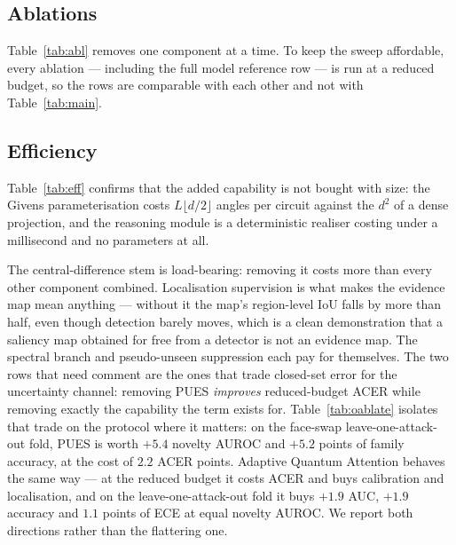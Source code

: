 \documentclass[conference]{IEEEtran}
\begin{document}
\begin{table}[t]
\centering
\caption{Faithfulness of the three intrinsic explanation channels, measured on the
model's own attack score. Deletion is the informative direction: lower than the
control means the named regions carry the decision.}
\label{tab:faith}
\footnotesize
\resizebox{\linewidth}{!}{}
\end{table}

\subsection{Ablations}\label{sec:abl}
Table~\ref{tab:abl} removes one component at a time. To keep the sweep affordable,
every ablation --- including the full model reference row --- is run at a reduced
budget, so the rows are comparable with each other and not with
Table~\ref{tab:main}.

\begin{table}[t]
\centering
\caption{Component ablation (reduced budget; deltas are w.r.t.\ the full model in
the first row).}
\label{tab:abl}
\small
\resizebox{\linewidth}{!}{}
\end{table}

\subsection{Efficiency}
Table~\ref{tab:eff} confirms that the added capability is not bought with size:
the Givens parameterisation costs $L\lfloor d/2\rfloor$ angles per circuit against
the $d^{2}$ of a dense projection, and the reasoning module is a deterministic
realiser costing under a millisecond and no parameters at all.

The central-difference stem is load-bearing: removing it costs more than every
other component combined. Localisation supervision is what makes the evidence map
mean anything --- without it the map's region-level IoU falls by more than half,
even though detection barely moves, which is a clean demonstration that a saliency
map obtained for free from a detector is not an evidence map. The spectral branch
and pseudo-unseen suppression each pay for themselves. The two rows that need
comment are the ones that trade closed-set error for the uncertainty channel:
removing PUES \emph{improves} reduced-budget ACER while removing exactly the
capability the term exists for. Table~\ref{tab:oablate} isolates that trade on the
protocol where it matters: on the face-swap leave-one-attack-out fold, PUES is worth
$+5.4$ novelty AUROC and $+5.2$ points of family accuracy, at the cost of $2.2$
ACER points. Adaptive Quantum Attention behaves the same way --- at the reduced
budget it costs ACER and buys calibration and localisation, and on the
leave-one-attack-out fold it buys $+1.9$ AUC, $+1.9$ accuracy and $1.1$ points of
ECE at equal novelty AUROC. We report both directions rather than the flattering
one.
\end{document}
